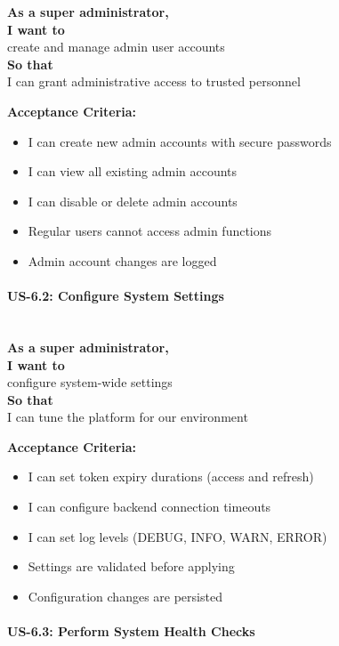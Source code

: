 \noindent\textbf{As a super administrator,} \\
\textbf{I want to} \\
create and manage admin user accounts \\
\textbf{So that} \\
I can grant administrative access to trusted personnel

\noindent\textbf{Acceptance Criteria:}
\begin{itemize}
    \item I can create new admin accounts with secure passwords
    \item I can view all existing admin accounts
    \item I can disable or delete admin accounts
    \item Regular users cannot access admin functions
    \item Admin account changes are logged
\end{itemize}

\paragraph{US-6.2: Configure System Settings}
\mbox{}\\[0.5em]

\noindent\textbf{As a super administrator,} \\
\textbf{I want to} \\
configure system-wide settings \\
\textbf{So that} \\
I can tune the platform for our environment

\noindent\textbf{Acceptance Criteria:}
\begin{itemize}
    \item I can set token expiry durations (access and refresh)
    \item I can configure backend connection timeouts
    \item I can set log levels (DEBUG, INFO, WARN, ERROR)
    \item Settings are validated before applying
    \item Configuration changes are persisted
\end{itemize}

\paragraph{US-6.3: Perform System Health Checks}
\mbox{}\\[0.5em]

